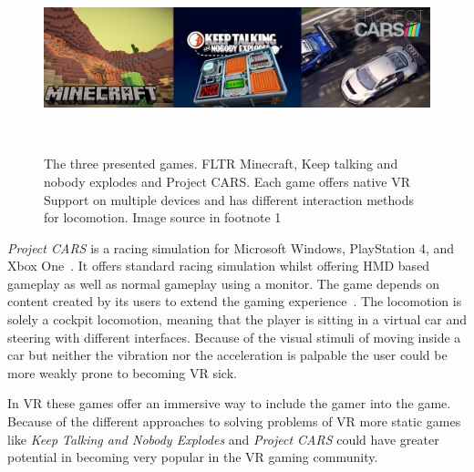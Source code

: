 \begin{figure}
	\centering
	\includegraphics[width=0.99\columnwidth]{./figures/banner}
	\caption[banner]{The three presented games. FLTR Minecraft, Keep talking and nobody explodes and Project CARS. Each game offers native VR Support on multiple devices and has different interaction methods for locomotion. Image source in footnote 1 \textcolor{white}{\footnotemark[1]}}~\label{fig:banner}
\end{figure}
\textit{Project CARS} is a racing simulation for Microsoft Windows, PlayStation 4, and Xbox One~\cite{game:projectC}. It offers standard racing simulation whilst offering HMD based gameplay as well as normal gameplay using a monitor. The game depends on content created by its users to extend the gaming experience~\cite{game:projectC}. \newline
The locomotion is solely a cockpit locomotion, meaning that the player is sitting in a virtual car and steering with different interfaces. Because of the visual stimuli of moving inside a car but neither the vibration nor the acceleration is palpable the user could be more weakly prone to becoming VR sick.

In VR these games offer an immersive way to include the gamer into the game. Because of the different approaches to solving problems of VR more static games like \textit{Keep Talking and Nobody Explodes} and \textit{Project CARS} could have greater potential in becoming very popular in the VR gaming community. 



